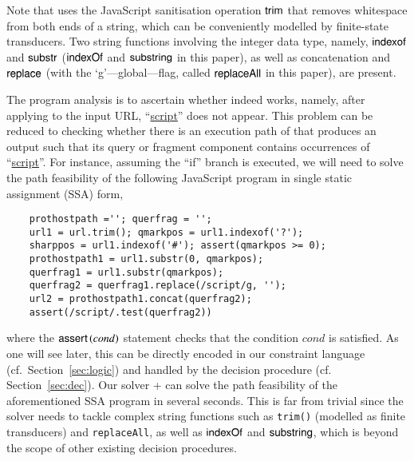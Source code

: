 {\noindent Note that {\urlxsssanitise} uses the JavaScript sanitisation operation $\sf trim$ that removes whitespace from both ends of a string, which can be conveniently modelled by finite-state transducers. Two string functions involving the integer data type, namely, $\sf indexof$ and $\sf substr$ ($\mathsf{indexOf}$ and $\mathsf{substring}$ in this paper), as well as concatenation and $\sf replace$ (with the `g'---global---flag, called $\mathsf{replaceAll}$ in this paper), are present. 



The program analysis is to ascertain whether {\urlxsssanitise} indeed works, namely, after applying {\urlxsssanitise} to the input URL, ``\url{script}'' does not appear.  This problem can be reduced to checking whether there is an execution path of {\urlxsssanitise} that produces an output such that its query or fragment component contains occurrences of ``\url{script}''. For instance, assuming  the ``if'' branch is executed, %
we will need to solve the path feasibility of the following JavaScript program in single static assignment (SSA) form,

{\small
	\begin{verbatim}
	prothostpath =''; querfrag = '';
	url1 = url.trim(); qmarkpos = url1.indexof('?');
	sharppos = url1.indexof('#'); assert(qmarkpos >= 0); 
	prothostpath1 = url1.substr(0, qmarkpos);
	querfrag1 = url1.substr(qmarkpos);
	querfrag2 = querfrag1.replace(/script/g, '');
	url2 = prothostpath1.concat(querfrag2);
	assert(/script/.test(querfrag2))
	\end{verbatim}
}

\vspace*{-0.5ex}
\noindent where the $\textsf{assert}\left(cond\right)$ statement checks that the condition $cond$ is satisfied. As one will see later, this can be directly encoded in our constraint language (cf.\ Section~\ref{sec:logic}) and handled by the decision procedure (cf. Section~\ref{sec:dec}). 
Our solver  {\ostrich}+ can solve the path feasibility of the aforementioned 
SSA program in several seconds. This is far from trivial since %
the solver needs to tackle complex string functions such as {\tt trim()} (modelled as finite transducers) and {\tt replaceAll}, %
as well as %
$\mathsf{indexOf}$  and $\mathsf{substring}$, which is beyond the scope of other existing decision procedures.  

}
